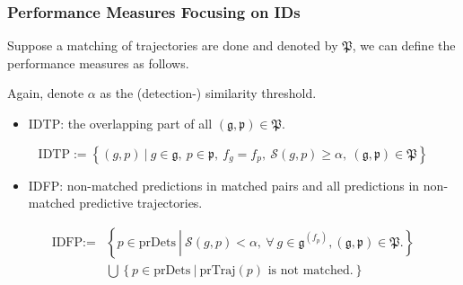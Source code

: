 \documentclass[slidetop, mathserif]{beamer}
\begin{document}
\begin{frame}
	\frametitle{Performance Measures Focusing on IDs}
			
	Suppose a matching of trajectories are done and denoted by $\mathfrak P$,
	we can define the performance measures as follows.
			
	\vspace{4pt}
			
	Again, denote $\alpha$ as the (detection-) similarity threshold.
	\begin{itemize}
		\item IDTP:
		      the overlapping part of all $(\mathfrak g, \mathfrak p) \in \mathfrak P$.
	\end{itemize}
			
	\vspace{-15pt}
	\[
		\text{IDTP} := \left\{ (g,p)\ |\ 
		g\in\mathfrak g, ~ p\in\mathfrak p, ~
		f_g=f_p, ~ 
		\mathcal S(g,p) \geq \alpha, ~ 
		(\mathfrak g, \mathfrak p)\in\mathfrak P
		\right\}
	\]
	\vspace{-10pt}
	\begin{itemize}
		\item IDFP:
		      non-matched predictions in matched pairs
		      and all predictions in non-matched predictive trajectories.
	\end{itemize}
	\begin{align*}
	\text{IDFP} := & \left\{ p\in\text{prDets}\ \left|\                                                
	\mathcal S(g,p)<\alpha, \ 
	\forall\ g\in\mathfrak g^{(f_p)},
	(\mathfrak g,\mathfrak p)\in\mathfrak P.
	\right.
	\right\} \\
					& \bigcup \left\{p \in \text{prDets}\ |\ \text{prTraj$(p)$ is not matched.}\right\} 
	\end{align*}
			    
\end{frame}
\end{document}
